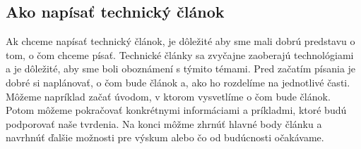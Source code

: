 \documentclass[10pt,oneside,slovak,a4paper]{article}
\begin{document}
\subsection{Ako napísať technický článok}
Ak chceme napísať technický článok, je dôležité aby sme mali dobrú predstavu o tom, o čom chceme písať. Technické články sa zvyčajne zaoberajú technológiami a je dôležité, aby sme boli oboznámení s týmito témami. Pred začatím písania je dobré si naplánovať, o čom bude článok a, ako ho rozdelíme na jednotlivé časti. Môžeme napríklad začať úvodom, v ktorom vysvetlíme o čom bude článok. Potom môžeme pokračovať konkrétnymi informáciami a príkladmi, ktoré budú podporovať naše tvrdenia. Na konci môžme zhrnúť hlavné body článku a navrhnúť ďalšie možnosti pre výskum alebo čo od budúcnosti očakávame.
\newpage


\end{document}
